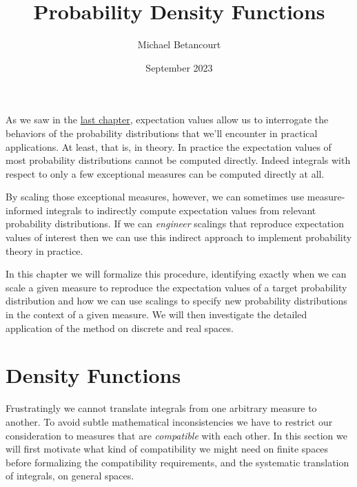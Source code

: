 \documentclass[
  letterpaper,
  DIV=11,
  numbers=noendperiod]{scrartcl}
\title{Probability Density Functions}
\author{Michael Betancourt}
\date{September 2023}
\renewcommand*\contentsname{Table of contents}
\newcommand\contentsname{Table of contents}
\begin{document}
\maketitle
\ifdefined\Shaded\renewenvironment{Shaded}{\begin{tcolorbox}[interior hidden, sharp corners, borderline west={3pt}{0pt}{shadecolor}, breakable, enhanced, boxrule=0pt, frame hidden]}{\end{tcolorbox}}\fi

\renewcommand*\contentsname{Table of contents}
{
\hypersetup{linkcolor=}
\setcounter{tocdepth}{3}
\tableofcontents
}
As we saw in the
\href{https://betanalpha.github.io/assets/chapters_html/expectation_values.html}{last
chapter}, expectation values allow us to interrogate the behaviors of
the probability distributions that we'll encounter in practical
applications. At least, that is, in theory. In practice the expectation
values of most probability distributions cannot be computed directly.
Indeed integrals with respect to only a few exceptional measures can be
computed directly at all.

By scaling those exceptional measures, however, we can sometimes use
measure-informed integrals to indirectly compute expectation values from
relevant probability distributions. If we can \emph{engineer} scalings
that reproduce expectation values of interest then we can use this
indirect approach to implement probability theory in practice.

In this chapter we will formalize this procedure, identifying exactly
when we can scale a given measure to reproduce the expectation values of
a target probability distribution and how we can use scalings to specify
new probability distributions in the context of a given measure. We will
then investigate the detailed application of the method on discrete and
real spaces.

\hypertarget{density-functions}{%
\section{Density Functions}\label{density-functions}}

Frustratingly we cannot translate integrals from one arbitrary measure
to another. To avoid subtle mathematical inconsistencies we have to
restrict our consideration to measures that are \emph{compatible} with
each other. In this section we will first motivate what kind of
compatibility we might need on finite spaces before formalizing the
compatibility requirements, and the systematic translation of integrals,
on general spaces.
\end{document}
